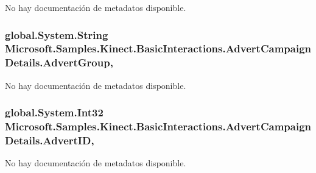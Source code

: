 No hay documentación de metadatos disponible. 

\hypertarget{class_microsoft_1_1_samples_1_1_kinect_1_1_basic_interactions_1_1_advert_campaign_details_a657b3817f3b4aeff89c4091b2178bd29}{
\subsubsection[{Advert\-Group}]{\setlength{\rightskip}{0pt plus 5cm}global.\-System.\-String Microsoft.\-Samples.\-Kinect.\-Basic\-Interactions.\-Advert\-Campaign\-Details.\-Advert\-Group\hspace{0.3cm}{\ttfamily [get]}, {\ttfamily [set]}}}\label{class_microsoft_1_1_samples_1_1_kinect_1_1_basic_interactions_1_1_advert_campaign_details_a657b3817f3b4aeff89c4091b2178bd29}


No hay documentación de metadatos disponible. 

\hypertarget{class_microsoft_1_1_samples_1_1_kinect_1_1_basic_interactions_1_1_advert_campaign_details_afee850570ed33d5a82ae58b3a25d2e65}{
\subsubsection[{Advert\-I\-D}]{\setlength{\rightskip}{0pt plus 5cm}global.\-System.\-Int32 Microsoft.\-Samples.\-Kinect.\-Basic\-Interactions.\-Advert\-Campaign\-Details.\-Advert\-I\-D\hspace{0.3cm}{\ttfamily [get]}, {\ttfamily [set]}}}\label{class_microsoft_1_1_samples_1_1_kinect_1_1_basic_interactions_1_1_advert_campaign_details_afee850570ed33d5a82ae58b3a25d2e65}


No hay documentación de metadatos disponible. 

